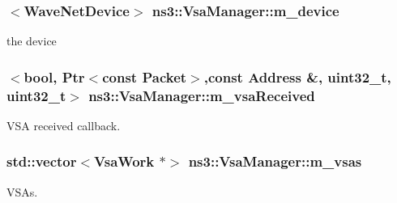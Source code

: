 \subsubsection[{\texorpdfstring{m\+\_\+device}{m_device}}]{$<${\bf Wave\+Net\+Device}$>$ ns3\+::\+Vsa\+Manager\+::m\+\_\+device\hspace{0.3cm}{\ttfamily [private]}}\hypertarget{classns3_1_1VsaManager_a52ae414f7b31a4d8b9c572689b7a7108}{}\label{classns3_1_1VsaManager_a52ae414f7b31a4d8b9c572689b7a7108}


the device 

\subsubsection[{\texorpdfstring{m\+\_\+vsa\+Received}{m_vsaReceived}}]{$<$bool, {\bf Ptr}$<$const {\bf Packet}$>$,const {\bf Address} \&, uint32\+\_\+t, uint32\+\_\+t$>$ ns3\+::\+Vsa\+Manager\+::m\+\_\+vsa\+Received\hspace{0.3cm}{\ttfamily [private]}}\hypertarget{classns3_1_1VsaManager_aeccc82895aa122c2625aaf564987034b}{}\label{classns3_1_1VsaManager_aeccc82895aa122c2625aaf564987034b}


V\+SA received callback. 

\subsubsection[{\texorpdfstring{m\+\_\+vsas}{m_vsas}}]{\setlength{\rightskip}{0pt plus 5cm}std\+::vector$<${\bf Vsa\+Work} $\ast$$>$ ns3\+::\+Vsa\+Manager\+::m\+\_\+vsas\hspace{0.3cm}{\ttfamily [private]}}\hypertarget{classns3_1_1VsaManager_aee890e87ec25f92c31c8afd8666f3031}{}\label{classns3_1_1VsaManager_aee890e87ec25f92c31c8afd8666f3031}


V\+S\+As. 

